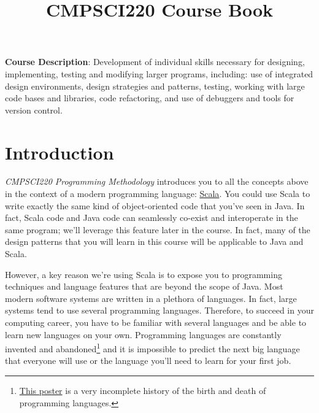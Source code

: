 \documentclass{book}
\title{CMPSCI220 Course Book}
\begin{document}
\maketitle
\tableofcontents

\newlecture

\textbf{Course Description}: Development of individual skills necessary for
designing, implementing, testing and modifying larger programs, including: use
of integrated design environments, design strategies and patterns, testing,
working with large code bases and libraries, code refactoring, and use of
debuggers and tools for version control.

\section{Introduction}

\emph{CMPSCI220 Programming Methodology} introduces you to all the concepts
above in the context of a modern programming language:
\href{http://www.scala-lang.org/what-is-scala.html}{Scala}.
You could use Scala to write exactly the same kind
of object-oriented code that you've seen in Java. In fact, Scala code and Java
code can seamlessly co-exist and interoperate in the same program; we'll
leverage this feature later in the course. In fact, many of the design patterns
that you will learn in this course will be applicable to Java and Scala.

However, a key reason we're using Scala is to expose you to programming techniques
and language features that are beyond the scope of Java. Most
modern software systems are written in a plethora of languages. In fact, large
systems tend to use several programming languages. Therefore, to succeed in your
computing career, you have to be familiar with several languages and be able to
learn new languages on your own. Programming
languages are constantly invented and abandoned\footnote{\href{http://www.oreillynet.com/pub/a/oreilly/news/languageposter_0504.html}{This poster} is a very incomplete history of the birth and death of programming languages.}
 and it is impossible to predict the next big language that everyone
will use or the language you'll need to learn for your first job.
\end{document}

